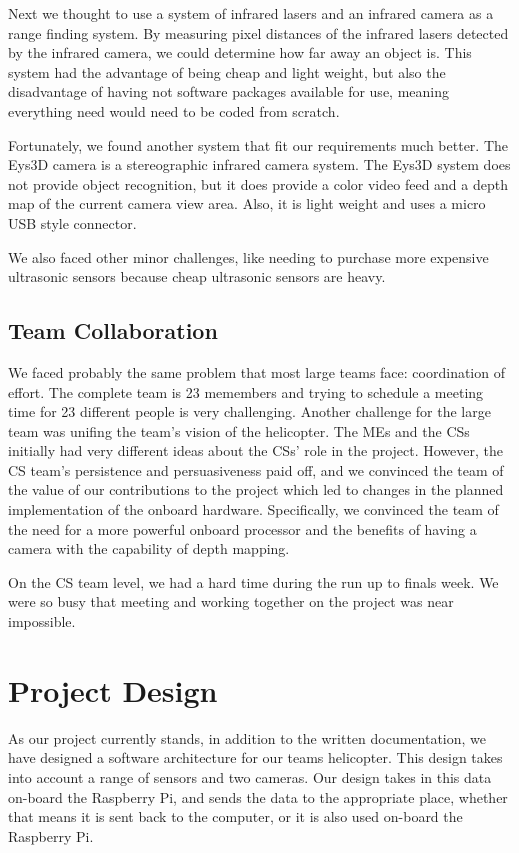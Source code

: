 \documentclass[onecolumn, oneside, letterpaper, draftclsnofoot, 10pt, compsoc]{IEEEtran}
\begin{document}
\noindent
Next we thought to use a system of infrared lasers and an infrared camera as a range finding system. By measuring pixel distances of the infrared lasers detected by the infrared camera, we could determine how far away an object is. This system had the advantage of being cheap and light weight, but also the disadvantage of having not software packages available for use, meaning everything need would need to be coded from scratch.

\noindent
Fortunately, we found another system that fit our requirements much better. The Eys3D camera is a stereographic infrared camera system. The Eys3D system does not provide object recognition, but it does provide a color video feed and a depth map of the current camera view area. Also, it is light weight and uses a micro USB style connector.

\noindent
We also faced other minor challenges, like needing to purchase more expensive ultrasonic sensors because cheap ultrasonic sensors are heavy.
\subsection{Team Collaboration}
We faced probably the same problem that most large teams face: coordination of effort. The complete team is 23 memembers and trying to schedule a meeting time for 23 different people is very challenging.
Another challenge for the large team was unifing the team's vision of the helicopter. The MEs and the CSs initially had very different ideas about the CSs' role in the project. However, the CS team's persistence and persuasiveness paid off, and we convinced the team of the value of our contributions to the project which led to changes in the planned implementation of the onboard hardware. Specifically, we convinced the team of the need for a more powerful onboard processor and the benefits of having a camera with the capability of depth mapping.

\noindent
On the CS team level, we had a hard time during the run up to finals week. We were so busy that meeting and working together on the project was near impossible.

\section{Project Design}
As our project currently stands, in addition to the written documentation, we have designed a software architecture for our teams helicopter. This design takes into account a range of sensors and two cameras. Our design takes in this data on-board the Raspberry Pi, and sends the data to the appropriate place, whether that means it is sent back to the computer, or it is also used on-board the Raspberry Pi.
\end{document}
